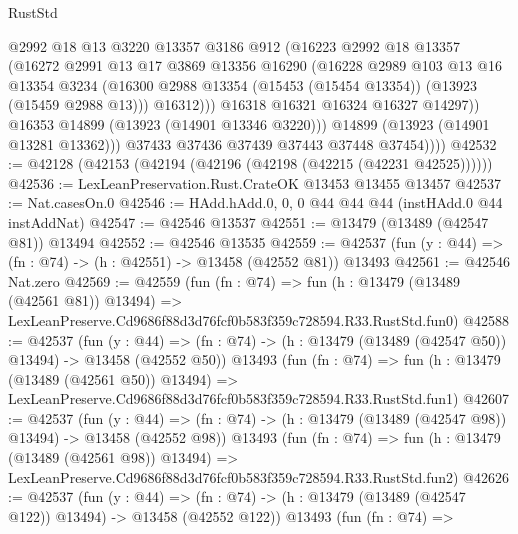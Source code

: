 \begin{lexlean}{RustStd}
\begin{coremodule}
                    @2992
                    @18
                    @13
                    @3220
                    @13357
                    @3186
                    @912
                    (@16223
                      @2992
                      @18
                      @13357
                      (@16272
                        @2991
                        @13
                        @17
                        @3869
                        @13356
                        @16290
                        (@16228
                          @2989
                          @103
                          @13
                          @16
                          @13354
                          @3234
                          (@16300 @2988 @13354 (@15453 (@15454 @13354)) (@13923 (@15459 @2988 @13)))
                          @16312)))
                    @16318
                    @16321
                    @16324
                    @16327
                    @14297))
                @16353
                @14899
                (@13923 (@14901 @13346 @3220)))
              @14899
              (@13923 (@14901 @13281 @13362)))
            @37433
            @37436
            @37439
            @37443
            @37448
            @37454))))
@42532 := @42128 (@42153 (@42194 (@42196 (@42198 (@42215 (@42231 @42525))))))
@42536 := LexLeanPreservation.Rust.CrateOK @13453 @13455 @13457
@42537 := Nat.casesOn.{0}
@42546 := HAdd.hAdd.{0, 0, 0} @44 @44 @44 (instHAdd.{0} @44 instAddNat)
@42547 := @42546 @13537
@42551 := @13479 (@13489 (@42547 @81)) @13494
@42552 := @42546 @13535
@42559 := @42537 (fun (y : @44) => (fn : @74) -> (h : @42551) -> @13458 (@42552 @81)) @13493
@42561 := @42546 Nat.zero
@42569 := @42559
    (fun (fn : @74) =>
    fun (h : @13479 (@13489 (@42561 @81)) @13494) =>
    LexLeanPreserve.Cd9686f88d3d76fcf0b583f359c728594.R33.RustStd.fun0)
@42588 := @42537
    (fun (y : @44) =>
    (fn : @74) -> (h : @13479 (@13489 (@42547 @50)) @13494) -> @13458 (@42552 @50))
    @13493
    (fun (fn : @74) =>
    fun (h : @13479 (@13489 (@42561 @50)) @13494) =>
    LexLeanPreserve.Cd9686f88d3d76fcf0b583f359c728594.R33.RustStd.fun1)
@42607 := @42537
    (fun (y : @44) =>
    (fn : @74) -> (h : @13479 (@13489 (@42547 @98)) @13494) -> @13458 (@42552 @98))
    @13493
    (fun (fn : @74) =>
    fun (h : @13479 (@13489 (@42561 @98)) @13494) =>
    LexLeanPreserve.Cd9686f88d3d76fcf0b583f359c728594.R33.RustStd.fun2)
@42626 := @42537
    (fun (y : @44) =>
    (fn : @74) -> (h : @13479 (@13489 (@42547 @122)) @13494) -> @13458 (@42552 @122))
    @13493
    (fun (fn : @74) =>

\end{coremodule}
\end{lexlean}
